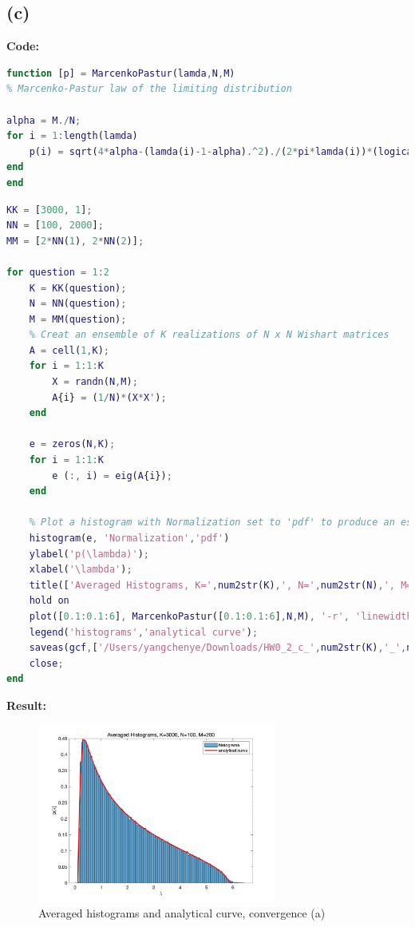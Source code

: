 \documentclass[twoside]{homework}
\begin{document}
\subsection*{(c)}
\textbf{Code:}
\begin{lstlisting}[language={Matlab}]
function [p] = MarcenkoPastur(lamda,N,M)
% Marcenko-Pastur law of the limiting distribution

alpha = M./N;
for i = 1:length(lamda)
    p(i) = sqrt(4*alpha-(lamda(i)-1-alpha).^2)./(2*pi*lamda(i))*(logical((1-sqrt(alpha)).^2 <= lamda(i)) && logical(lamda(i) <= (1+sqrt(alpha)).^2));
end
end
\end{lstlisting}
\begin{lstlisting}[language={Matlab}]
KK = [3000, 1];
NN = [100, 2000];
MM = [2*NN(1), 2*NN(2)];

for question = 1:2
    K = KK(question);
    N = NN(question);
    M = MM(question);
    % Creat an ensemble of K realizations of N x N Wishart matrices
    A = cell(1,K);
    for i = 1:1:K
        X = randn(N,M);
        A{i} = (1/N)*(X*X');
    end

    e = zeros(N,K);
    for i = 1:1:K
        e (:, i) = eig(A{i});
    end

    % Plot a histogram with Normalization set to 'pdf' to produce an estimation of the probability density function.
    histogram(e, 'Normalization','pdf')
    ylabel('p(\lambda)');
    xlabel('\lambda');
    title(['Averaged Histograms, K=',num2str(K),', N=',num2str(N),', M=',num2str(M)]);
    hold on
    plot([0.1:0.1:6], MarcenkoPastur([0.1:0.1:6],N,M), '-r', 'linewidth', 2);
    legend('histograms','analytical curve');
    saveas(gcf,['/Users/yangchenye/Downloads/HW0_2_c_',num2str(K),'_',num2str(N),'_',num2str(M),'.png'])
    close;
end
\end{lstlisting}
\newpage
\textbf{Result:}
\begin{figure}[!h]
\begin{center}
\includegraphics[width=0.70\textwidth]{HW0_2_c_3000_100_200.png}
\end{center}
\caption{Averaged histograms and analytical curve, convergence (a)}
\label{fig:HW0_2_c_a}
\end{figure}
\end{document}
